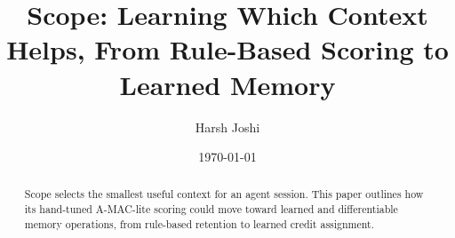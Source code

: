 \documentclass[twocolumn]{article}
\title{Scope: Learning Which Context Helps, From Rule-Based Scoring to Learned Memory}
\author{Harsh Joshi}
\date{\today}
\begin{document}
\maketitle

\begin{abstract}
Scope selects the smallest useful context for an agent session. This paper outlines
how its hand-tuned A-MAC-lite scoring could move toward learned and differentiable
memory operations, from rule-based retention to learned credit assignment.
\end{abstract}





\end{document}
